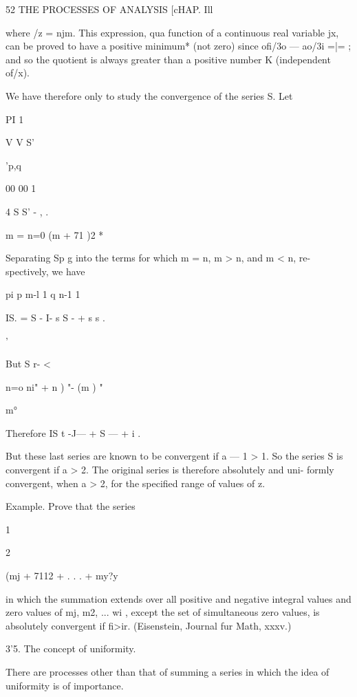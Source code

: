 52 THE PROCESSES OF ANALYSIS [cHAP. Ill 

where /z = njm. This expression, qua function of a continuous real variable jx, 
can be proved to have a positive minimum* (not zero) since ofi/3o — ao/3i =|= ; 
and so the quotient is always greater than a positive number K (independent 
of/x). 

We have therefore only to study the convergence of the series S. Let 

PI 1 

V   V S' 



 'p,q 



00 00 1 

 4 S S' - , . 

m = n=0 (m  + 71 )2 * 

Separating Sp g into the terms for which m = n, m > n, and m < n, re- 
spectively, we have 

pi p m-l 1 q n-1 1 

IS.   = S - I- s S - + s s . 

'%

But S r- < 



n=o  ni" + n ) "- (m ) " 



m° 



Therefore IS   t -J— + S — + i  . 

But these last series are known to be convergent if a — 1 > 1. So the series S 
is convergent if a > 2. The original series is therefore absolutely and uni- 
formly convergent, when a > 2, for the specified range of values of z. 

Example. Prove that the series 

1 

2 



(mj  + 7112  + . . . + my?y  

in which the summation extends over all positive and negative integral values and zero 
values of mj, m2, ... wi , except the set of simultaneous zero values, is absolutely convergent 
if fi>ir. (Eisenstein, Journal fur Math, xxxv.) 

3'5. The concept of uniformity. 

There are processes other than that of summing a series in which the idea 
of uniformity is of importance. 

